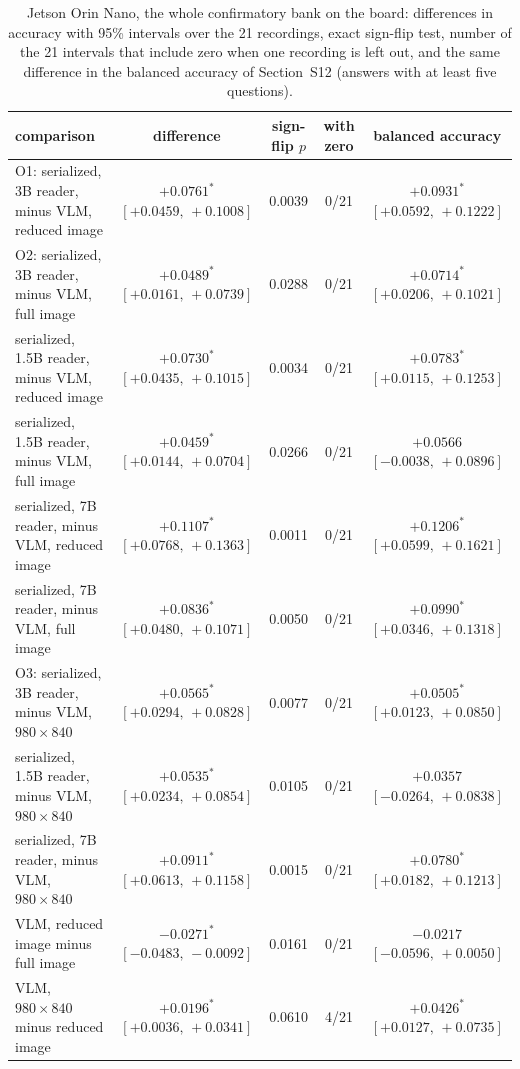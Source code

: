 \documentclass[10pt]{article}
\renewcommand{\thetable}{S\arabic{table}}
\newcommand{\fixtab}[1]{\renewcommand{\thetable}{#1}}
\begin{document}
\fixtab{S8c}\begin{table}[h]\centering\footnotesize
\caption{Jetson Orin Nano, the whole confirmatory bank on the board: differences in accuracy with 95\% intervals over the 21 recordings, exact sign-flip test, number of the 21 intervals that include zero when one recording is left out, and the same difference in the balanced accuracy of Section~S12 (answers with at least five questions).}\label{tab:s8c}
\setlength{\tabcolsep}{2.0pt}\begin{tabular}{@{}lcccc@{}}
\toprule
comparison & difference & sign-flip $p$ & with zero & balanced accuracy \\ \midrule
O1: serialized, 3B reader, minus VLM, reduced image & $+0.0761^{*}$ $[+0.0459,\,+0.1008]$ & 0.0039 & 0/21 & $+0.0931^{*}$ $[+0.0592,\,+0.1222]$ \\
O2: serialized, 3B reader, minus VLM, full image & $+0.0489^{*}$ $[+0.0161,\,+0.0739]$ & 0.0288 & 0/21 & $+0.0714^{*}$ $[+0.0206,\,+0.1021]$ \\
serialized, 1.5B reader, minus VLM, reduced image & $+0.0730^{*}$ $[+0.0435,\,+0.1015]$ & 0.0034 & 0/21 & $+0.0783^{*}$ $[+0.0115,\,+0.1253]$ \\
serialized, 1.5B reader, minus VLM, full image & $+0.0459^{*}$ $[+0.0144,\,+0.0704]$ & 0.0266 & 0/21 & $+0.0566$ $[-0.0038,\,+0.0896]$ \\
serialized, 7B reader, minus VLM, reduced image & $+0.1107^{*}$ $[+0.0768,\,+0.1363]$ & 0.0011 & 0/21 & $+0.1206^{*}$ $[+0.0599,\,+0.1621]$ \\
serialized, 7B reader, minus VLM, full image & $+0.0836^{*}$ $[+0.0480,\,+0.1071]$ & 0.0050 & 0/21 & $+0.0990^{*}$ $[+0.0346,\,+0.1318]$ \\
O3: serialized, 3B reader, minus VLM, $980\times840$ & $+0.0565^{*}$ $[+0.0294,\,+0.0828]$ & 0.0077 & 0/21 & $+0.0505^{*}$ $[+0.0123,\,+0.0850]$ \\
serialized, 1.5B reader, minus VLM, $980\times840$ & $+0.0535^{*}$ $[+0.0234,\,+0.0854]$ & 0.0105 & 0/21 & $+0.0357$ $[-0.0264,\,+0.0838]$ \\
serialized, 7B reader, minus VLM, $980\times840$ & $+0.0911^{*}$ $[+0.0613,\,+0.1158]$ & 0.0015 & 0/21 & $+0.0780^{*}$ $[+0.0182,\,+0.1213]$ \\
VLM, reduced image minus full image & $-0.0271^{*}$ $[-0.0483,\,-0.0092]$ & 0.0161 & 0/21 & $-0.0217$ $[-0.0596,\,+0.0050]$ \\
VLM, $980\times840$ minus reduced image & $+0.0196^{*}$ $[+0.0036,\,+0.0341]$ & 0.0610 & 4/21 & $+0.0426^{*}$ $[+0.0127,\,+0.0735]$ \\

\end{tabular}
\end{table}
\end{document}
